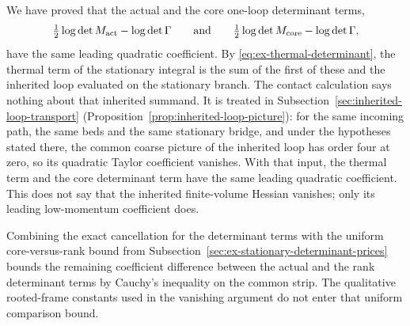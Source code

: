 We have proved that the actual and the core one-loop determinant terms,
\[
 \tfrac12\log\det M_{\rm act}-\log\det\Gamma
 \qquad\text{and}\qquad
 \tfrac12\log\det M_{\rm core}-\log\det\Gamma ,
\]
have the same leading quadratic coefficient. By
\eqref{eq:ex-thermal-determinant}, the thermal term of the stationary
integral is the sum of the first of these and the inherited loop
evaluated on the stationary branch. The contact calculation says
nothing about that inherited summand. It is treated in
Subsection~\ref{sec:inherited-loop-transport}
(Proposition~\ref{prop:inherited-loop-picture}): for the same incoming path,
the same beds and the same stationary bridge, and under the hypotheses
stated there, the common coarse picture of the inherited loop has
order four at zero, so its quadratic Taylor coefficient vanishes. With
that input, the thermal term and the core determinant term have the
same leading quadratic coefficient. This does not say that the
inherited finite-volume Hessian vanishes; only its leading
low-momentum coefficient does.

Combining the exact cancellation for the determinant terms with the
uniform core-versus-rank bound from
Subsection~\ref{sec:ex-stationary-determinant-prices} bounds the
remaining coefficient difference between the actual and the rank
determinant terms by Cauchy's inequality on the common strip. The
qualitative rooted-frame constants used in the vanishing argument do
not enter that uniform comparison bound.
